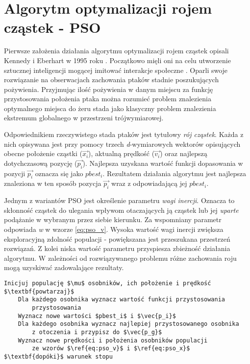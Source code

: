 \section{Algorytm optymalizacji rojem cząstek - PSO}
\par
Pierwsze założenia działania algorytmu optymalizacji rojem cząstek opisali Kennedy i Eberhart w 1995 roku \cite{kennedy1995pso}. Początkowo mięli oni na celu utworzenie sztucznej inteligencji mogącej imitować interakcje społeczne \cite{poli2007particle}. Oparli swoje rozwiązanie na obserwacjach zachowania ptaków stadnie poszukujących pożywienia. Przyjmując ilość pożywienia w danym miejscu za funkcję przystosowania położenia ptaka można rozumieć problem znalezienia optymalnego miejsca do żeru stada jako klasyczny problem znalezienia ekstremum globalnego w przestrzeni trójwymiarowej.
\par
Odpowiednikiem rzeczywistego stada ptaków jest tytułowy \emph{rój cząstek}. Każda z nich opisywana jest przy pomocy trzech \emph{d}-wymiarowych wektorów opisujących obecne położenie cząstki ($\vec{x_i}$), aktualną prędkość ($\vec{v_i}$) oraz najlepszą dotychczasową pozycję ($\vec{p_i}$). Najlepsza uzyskana wartość funkcji dopasowania w pozycji $\vec{p_i}$ oznacza się jako $pbest_i$. Rezultatem działania algorytmu jest najlepsza znaleziona w ten sposób pozycja $\vec{p_i}$ wraz z odpowiadającą jej $pbest_i$.
\par
Jednym z wariantów PSO jest określenie parametru \emph{wagi inercji}. Oznacza to skłonność cząstek do ulegania wpływom otaczających ją cząstek lub jej \emph{uparte} podążanie w wybranym przez siebie kierunku. Za wspomniany parametr odpowiada \emph{w} w wzorze \ref{eq:pso_v}. Wysoka wartość wagi inercji zwiększa eksploracyjną zdolność populacji - powiększana jest przeszukana przestrzeń rozwiązań. Z kolei niska wartość parametru przyspiesza zbieżność działania algorytmu. W zależności od rozwiązywanego problemu różne zachowania roju mogą uzyskiwać zadowalające rezultaty.
\begin{lstlisting}[caption=Schemat algorytmu optymalizacji rojem cząstek - \textbf{PSO}, label=lst:pso_pseudocode, mathescape, breaklines=true]
Inicjuj populację $\mu$ osobników, ich położenie i prędkość
$\textbf{powtarzaj}$
    Dla każdego osobnika wyznacz wartość funkcji przystosowania 
        przystosowania 
    Wyznacz nowe wartości $pbest_i$ i $\vec{p_i}$
    Dla każdego osobnika wyznacz najlepiej przystosowanego osobnika 
        z otoczenia i przypisz do $\vec{p_g}$
    Wyznacz nowe prędkości i położenia osobników populacji
        ze wzorów $\ref{eq:pso_v}$ i $\ref{eq:pso_x}$
$\textbf{dopóki}$ warunek stopu
\end{lstlisting}

